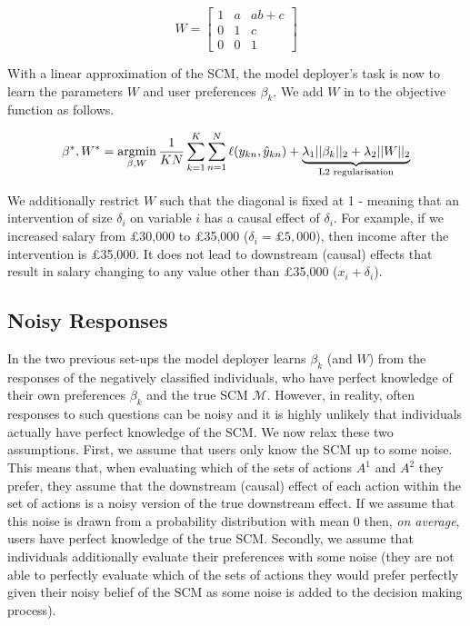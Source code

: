 \begin{equation}
	W = 
	\begin{bmatrix}
		1 & a & ab+c \\
		0 & 1 & c \\
		0 & 0 & 1
	\end{bmatrix}
\end{equation}

With a linear approximation of the SCM, the model deployer's task is now to learn the parameters $W$ and user preferences $\beta_k$. We add $W$ in to the objective function as follows.

\begin{equation}
	\beta^*, W^* = \operatorname*{argmin}_{\beta, W} \frac{1}{KN} \sum_{k=1}^K \sum_{n=1}^N \ell (y_{kn}, \hat{y}_{kn}) + \underbrace{\lambda_1 ||\beta_k||_2 + \lambda_2||W||_2}_{\text{L2 regularisation}}
\end{equation}

We additionally restrict $W$ such that the diagonal is fixed at 1 - meaning that an intervention of size $\delta_i$ on variable $i$ has a causal effect of $\delta_i$. For example, if we increased salary from £30,000 to £35,000 ($\delta_i=£5,000$), then income after the intervention is £35,000. It does not lead to downstream (causal) effects that result in salary changing to any value other than £35,000 ($x_i + \delta_i$).

\subsection{Noisy Responses} \label{section:noisy_responses}

In the two previous set-ups the model deployer learns $\beta_k$ (and $W$) from the responses of the negatively classified individuals, who have perfect knowledge of their own preferences $\beta_k$ and the true SCM $\mathcal{M}$. However, in reality, often responses to such questions can be noisy and it is highly unlikely that individuals actually have perfect knowledge of the SCM. We now relax these two assumptions. First, we assume that users only know the SCM up to some noise. This means that, when evaluating which of the sets of actions $A^1$ and $A^2$ they prefer, they assume that the downstream (causal) effect of each action within the set of actions is a noisy version of the true downstream effect. If we assume that this noise is drawn from a probability distribution with mean 0 then, \textit{on average}, users have perfect knowledge of the true SCM. Secondly, we assume that individuals additionally evaluate their preferences with some noise (they are not able to perfectly evaluate which of the sets of actions they would prefer perfectly given their noisy belief of the SCM as some noise is added to the decision making process).\\

